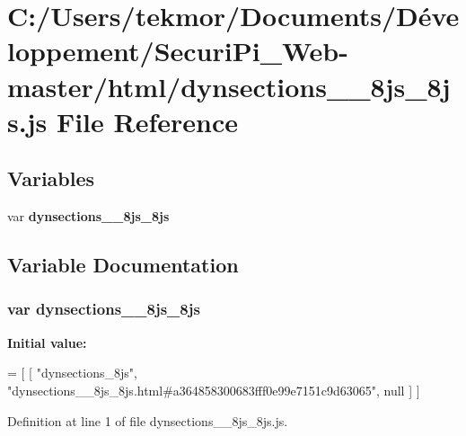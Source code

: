 \section{C\+:/\+Users/tekmor/\+Documents/\+Développement/\+Securi\+Pi\+\_\+\+Web-\/master/html/dynsections\+\_\+\+\_\+8js\+\_\+8js.js File Reference}
\label{dynsections____8js__8js_8js}
\subsection*{Variables}
\begin{DoxyCompactItemize}
\item 
var {\bf dynsections\+\_\+\+\_\+8js\+\_\+8js}
\end{DoxyCompactItemize}


\subsection{Variable Documentation}
\subsubsection[{dynsections\+\_\+\+\_\+8js\+\_\+8js}]{\setlength{\rightskip}{0pt plus 5cm}var dynsections\+\_\+\+\_\+8js\+\_\+8js}\label{dynsections____8js__8js_8js_a1d04f98146e93984804e2f47a2d1bb43}
{\bfseries Initial value\+:}
\begin{DoxyCode}
=
[
    [ \textcolor{stringliteral}{"dynsections\_8js"}, \textcolor{stringliteral}{"dynsections\_\_8js\_8js.html#a364858300683fff0e99e7151c9d63065"}, null ]
]
\end{DoxyCode}


Definition at line 1 of file dynsections\+\_\+\+\_\+8js\+\_\+8js.\+js.

